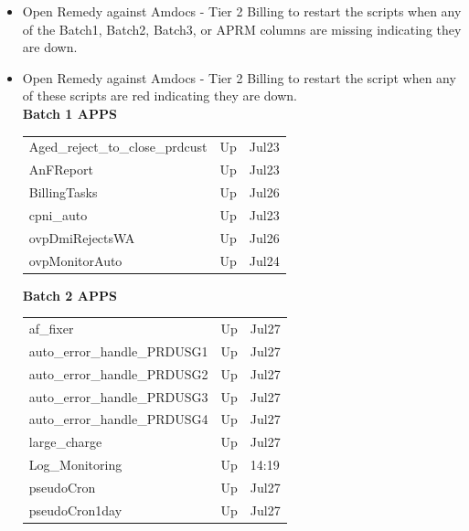 \documentclass[12pt,twoside]{article}
\begin{document}
\begin{itemize}
\item Open Remedy against Amdocs - Tier 2 Billing to restart the scripts when any of the Batch1, Batch2, Batch3, or APRM columns are missing indicating they are down.
\item Open Remedy against Amdocs - Tier 2 Billing to restart the script when any of these scripts are red indicating they are down.\\
\textbf{Batch 1 APPS}\\

\begin{center}
\begin{tabular}{lll}
\hline
 Aged\_reject\_to\_close\_prdcust  &  Up  &  Jul23  \\
 AnFReport                         &  Up  &  Jul23  \\
 BillingTasks                      &  Up  &  Jul26  \\
 cpni\_auto                        &  Up  &  Jul23  \\
 ovpDmiRejectsWA                   &  Up  &  Jul26  \\
 ovpMonitorAuto                    &  Up  &  Jul24  \\
\hline
\end{tabular}
\end{center}


    \textbf{Batch 2 APPS}\\

\begin{center}
\begin{tabular}{lll}
\hline
 af\_fixer                     &  Up  &  Jul27  \\
 auto\_error\_handle\_PRDUSG1  &  Up  &  Jul27  \\
 auto\_error\_handle\_PRDUSG2  &  Up  &  Jul27  \\
 auto\_error\_handle\_PRDUSG3  &  Up  &  Jul27  \\
 auto\_error\_handle\_PRDUSG4  &  Up  &  Jul27  \\
 large\_charge                 &  Up  &  Jul27  \\
 Log\_Monitoring               &  Up  &  14:19  \\
 pseudoCron                    &  Up  &  Jul27  \\
 pseudoCron1day                &  Up  &  Jul27  \\
\hline
\end{tabular}
\end{center}



\end{itemize}
\end{document}
